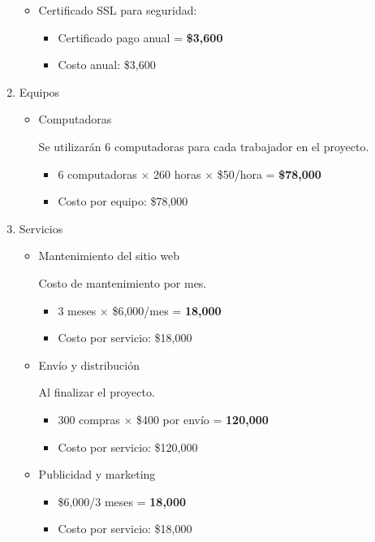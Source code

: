 \documentclass[12pt]{article}
\begin{document}
\begin{enumerate}
\begin{itemize}
		\item Certificado SSL para seguridad:
        \begin{itemize}
            \item Certificado pago anual = \textbf{\$3,600}
            \item Costo anual: \$3,600
        \end{itemize}

	\end{itemize}

	\item Equipos

	\begin{itemize}

		\item Computadoras

		Se utilizarán 6 computadoras para cada trabajador en el proyecto.
		\begin{itemize}
            \item 6 computadoras $\times$ 260 horas $\times$ \$50/hora = \textbf{\$78,000}
            \item Costo por equipo: \$78,000
        \end{itemize}

	\end{itemize}

	

	\item Servicios

	\begin{itemize}

		\item Mantenimiento del sitio web

		Costo de mantenimiento por mes.
		\begin{itemize}
            \item 3 meses $\times$ \$6,000/mes = \textbf{18,000}
            \item Costo por servicio: \$18,000
        \end{itemize}

		\item Envío y distribución
		
		Al finalizar el proyecto.
		\begin{itemize}
            \item 300 compras $\times$ \$400 por envío = \textbf{120,000}
            \item Costo por servicio: \$120,000
        \end{itemize}

		\item Publicidad y marketing

		\begin{itemize}
			\item \$6,000/3 meses = \textbf{18,000}
            \item Costo por servicio: \$18,000
        \end{itemize}

	\end{itemize}

\end{enumerate}
    
\end{document}
